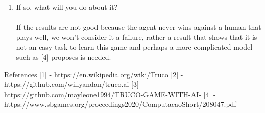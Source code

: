 \documentclass{article}
\begin{document}
\begin{enumerate}
\item If so, what will you do about it?
\\\\	
If the results are not good because the agent never wins against a human that plays well, we won’t consider it a failure, rather a result that shows that it is not an easy task to learn this game and perhaps a more complicated model such as [4] proposes is needed.

\end{enumerate}


References
[1] -  https://en.wikipedia.org/wiki/Truco
[2] - https://github.com/willyandan/truco.ai
[3] - https://github.com/mayleone1994/TRUCO-GAME-WITH-AI-
[4] - https://www.sbgames.org/proceedings2020/ComputacaoShort/208047.pdf        
\end{document}
